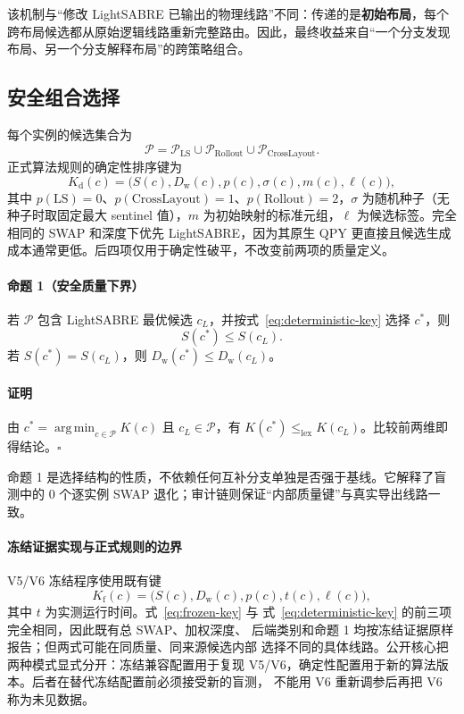 \documentclass[11pt,a4paper]{article}
\newcommand{\Portfolio}{\mathcal P}
\newcommand{\DepthW}{D_{\mathrm w}}
\newcommand{\argmin}{\operatorname*{arg\,min}}
\newcommand{\LS}{\mathrm{LS}}
\newcommand{\Rollout}{\mathrm{Rollout}}
\newcommand{\CrossLayout}{\mathrm{CrossLayout}}
\begin{document}
该机制与“修改 LightSABRE 已输出的物理线路”不同：传递的是\textbf{初始布局}，每个跨布局候选都从原始逻辑线路重新完整路由。因此，最终收益来自“一个分支发现布局、另一个分支解释布局”的跨策略组合。

\subsection{安全组合选择}

每个实例的候选集合为
\begin{equation}
  \Portfolio
  =\Portfolio_{\LS}
  \cup\Portfolio_{\Rollout}
  \cup\Portfolio_{\CrossLayout}.
\end{equation}
正式算法规则的确定性排序键为
\begin{equation}
  K_{\mathrm d}(c)=
  \bigl(S(c),\DepthW(c),p(c),\sigma(c),m(c),\ell(c)\bigr),
  \label{eq:deterministic-key}
\end{equation}
其中 $p(\LS)=0$、$p(\CrossLayout)=1$、$p(\Rollout)=2$，$\sigma$ 为随机种子（无种子时取固定最大 sentinel 值），$m$ 为初始映射的标准元组，$\ell$ 为候选标签。完全相同的 SWAP 和深度下优先 LightSABRE，因为其原生 QPY 更直接且候选生成成本通常更低。后四项仅用于确定性破平，不改变前两项的质量定义。

\paragraph{命题 1（安全质量下界）}
若 $\Portfolio$ 包含 LightSABRE 最优候选 $c_L$，并按式~\eqref{eq:deterministic-key} 选择 $c^*$，则
\begin{equation}
  S(c^*)\le S(c_L).
\end{equation}
若 $S(c^*)=S(c_L)$，则 $\DepthW(c^*)\le\DepthW(c_L)$。

\paragraph{证明}
由 $c^*=\argmin_{c\in\Portfolio}K(c)$ 且 $c_L\in\Portfolio$，有
$K(c^*)\le_{\mathrm{lex}}K(c_L)$。比较前两维即得结论。\hfill$\square$

命题 1 是选择结构的性质，不依赖任何互补分支单独是否强于基线。它解释了盲测中的 0 个逐实例 SWAP 退化；审计链则保证“内部质量键”与真实导出线路一致。

\paragraph{冻结证据实现与正式规则的边界}
V5/V6 冻结程序使用既有键
\begin{equation}
  K_{\mathrm f}(c)=
  \bigl(S(c),\DepthW(c),p(c),t(c),\ell(c)\bigr),
  \label{eq:frozen-key}
\end{equation}
其中 $t$ 为实测运行时间。式~\eqref{eq:frozen-key} 与
式~\eqref{eq:deterministic-key} 的前三项完全相同，因此既有总 SWAP、加权深度、
后端类别和命题 1 均按冻结证据原样报告；但两式可能在同质量、同来源候选内部
选择不同的具体线路。公开核心把两种模式显式分开：冻结兼容配置用于复现
V5/V6，确定性配置用于新的算法版本。后者在替代冻结配置前必须接受新的盲测，
不能用 V6 重新调参后再把 V6 称为未见数据。
\end{document}
